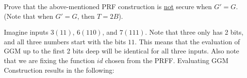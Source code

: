 \documentclass[11pt]{article}
\begin{document}
\begin{enumerate}
 Prove that the above-mentioned PRF construction is \ul{not} secure when $G'=G$. (Note that when $G'=G$, then $T=2B$). 
  

    {\bfseries

    Imagine inputs $3 (11)$, $6 (110)$, and $7 (111)$. Note that three only has 2 bits, and all three numbers start with the bits $11$. This means that the evaluation of GGM up to the first 2 bits deep will be identical for all three inputs. Also note that we are fixing the function $id$ chosen from the PRFF. Evaluating GGM Construction results in the following:



\begin{tikzpicture}[x=0.75pt,y=0.75pt,yscale=-1,xscale=1]


\end{tikzpicture}}
\end{enumerate}
\end{document}

